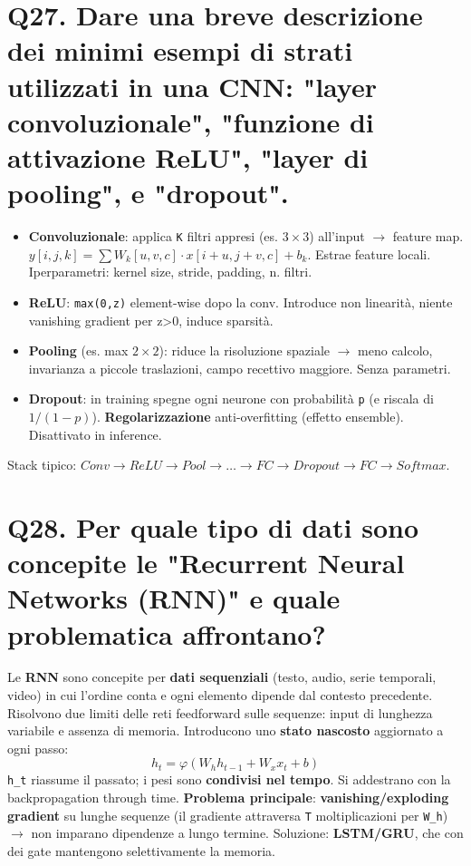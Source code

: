 \documentclass[11pt,a4paper]{article}
\begin{document}
\section*{Q27. Dare una breve descrizione dei minimi esempi di strati utilizzati in una CNN: "layer convoluzionale", "funzione di attivazione ReLU", "layer di pooling", e "dropout".}
\begin{itemize}
\item \textbf{Convoluzionale}: applica \texttt{K} filtri appresi (es. $3\times 3$) all'input $\to $ feature map. $y[i,j,k] = \sum  W_k[u,v,c]\cdot x[i+u,j+v,c] + b_k$. Estrae feature locali. Iperparametri: kernel size, stride, padding, n. filtri.
\item \textbf{ReLU}: \texttt{max(0,z)} element-wise dopo la conv. Introduce non linearità, niente vanishing gradient per z>0, induce sparsità.
\item \textbf{Pooling} (es. max $2\times 2$): riduce la risoluzione spaziale $\to $ meno calcolo, invarianza a piccole traslazioni, campo recettivo maggiore. Senza parametri.
\item \textbf{Dropout}: in training spegne ogni neurone con probabilità \texttt{p} (e riscala di $1/(1-p)$). \textbf{Regolarizzazione} anti-overfitting (effetto ensemble). Disattivato in inference.
\end{itemize}
Stack tipico: $Conv \to  ReLU \to  Pool \to  \dots  \to  FC \to  Dropout \to  FC \to  Softmax$.
\newpage
\section*{Q28. Per quale tipo di dati sono concepite le "Recurrent Neural Networks (RNN)" e quale problematica affrontano?}
Le \textbf{RNN} sono concepite per \textbf{dati sequenziali} (testo, audio, serie temporali, video) in cui l'ordine conta e ogni elemento dipende dal contesto precedente.
Risolvono due limiti delle reti feedforward sulle sequenze: input di lunghezza variabile e assenza di memoria. Introducono uno \textbf{stato nascosto} aggiornato a ogni passo:
\[ h_t = \varphi (W_h h_{t-1} + W_x x_t + b) \]
\texttt{h\_t} riassume il passato; i pesi sono \textbf{condivisi nel tempo}. Si addestrano con la backpropagation through time.
\textbf{Problema principale}: \textbf{vanishing/exploding gradient} su lunghe sequenze (il gradiente attraversa \texttt{T} moltiplicazioni per \texttt{W\_h}) $\to $ non imparano dipendenze a lungo termine. Soluzione: \textbf{LSTM/GRU}, che con dei gate mantengono selettivamente la memoria.
\newpage
\end{document}
